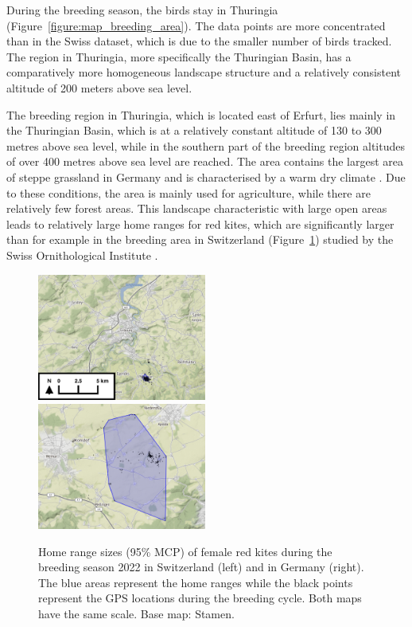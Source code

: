 During the breeding season, the birds stay in Thuringia (Figure~\ref{figure:map_breeding_area}). The data points are more concentrated than in the Swiss dataset, which is due to the smaller number of birds tracked. The region in Thuringia, more specifically the Thuringian Basin, has a comparatively more homogeneous landscape structure and a relatively consistent altitude of 200 meters above sea level.

The breeding region in Thuringia, which is located east of Erfurt, lies mainly in the Thuringian Basin, which is at a relatively constant altitude of 130 to 300 metres above sea level, while in the southern part of the breeding region altitudes of over 400 metres above sea level are reached. The area contains the largest area of steppe grassland in Germany and is characterised by a warm dry climate \parencite{baumbach2013steppen}. Due to these conditions, the area is mainly used for agriculture, while there are relatively few forest areas. This landscape characteristic with large open areas leads to relatively large home ranges for red kites, which are significantly larger than for example in the breeding area in Switzerland (Figure~\ref{figure:home_range_diff_ch_de}) studied by the Swiss Ornithological Institute \parencite{aebischer2021rotmilan, pfeiffer2015gps}.

\begin{figure}[H]
\centering
\includegraphics[width=0.495\textwidth]{figures/maps/CH_f_2022.png}
\includegraphics[width=0.495\textwidth]{figures/maps/DE_f_2022.png}
\caption[Comparison of home range sizes in Switzerland and Germany]{Home range sizes (95\% MCP) of female red kites during the breeding season 2022 in Switzerland (left) and in Germany (right). The blue areas represent the home ranges while the black points represent the GPS locations during the breeding cycle. Both maps have the same scale. Base map: Stamen.}
\label{figure:home_range_diff_ch_de}
\end{figure}

